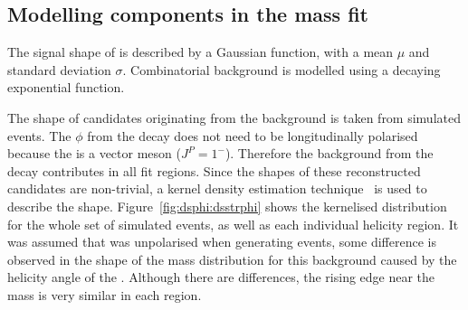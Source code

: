 
\subsection{Modelling components in the mass fit}
The signal shape of \btodsphi is described by a Gaussian function, with a mean $\mu$ and standard
deviation $\sigma$.
Combinatorial background is modelled using a decaying exponential function.

The shape of \Bp candidates originating from the \btodsstrphi background is taken from simulated
events.
The $\phi$ from the decay \btodsstrphi does not need to be longitudinally polarised because the
\Dssp is a vector meson ($J^P=1^-$).
Therefore the background from the decay \btodsstrphi contributes in all fit regions.
Since the shapes of these reconstructed candidates are non-trivial, a kernel density estimation
technique~\cite{Cranmer:2000du} is used to describe the shape.
Figure~\ref{fig:dsphi:dsstrphi} shows the kernelised distribution for the whole set of simulated
events, as well as each individual helicity region.
It was assumed that \Dssp was unpolarised when generating events, some difference is observed in
the shape of the mass distribution for this background caused by the helicity angle of the \phii.
Although there are differences, the rising edge
near the \Bp mass is very similar in each region.

